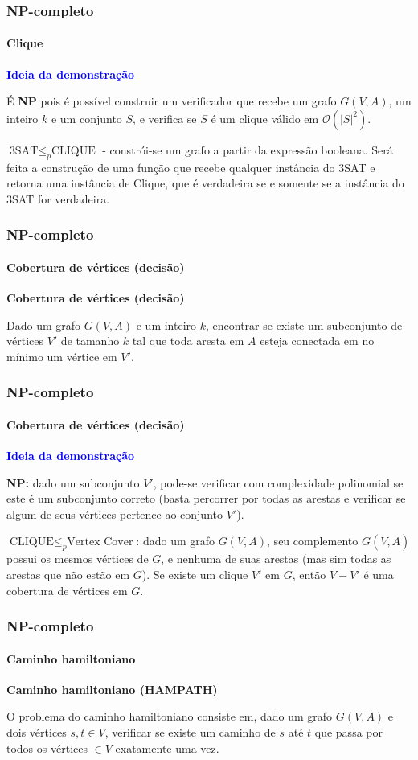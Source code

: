 \documentclass{beamer}
\begin{document}
\begin{frame}
\frametitle{NP-completo}
\framesubtitle{Clique}

\textcolor{blue}{\textbf{Ideia da demonstração}}

É \textbf{NP} pois é possível construir um verificador que recebe um grafo $G(V, A)$, um inteiro $k$ e um conjunto $S$, e verifica se $S$ é um clique válido em $\mathcal{O}(|S|^2)$.

\bigskip

$\text{3SAT} \leq_p \text{CLIQUE}$ - constrói-se um grafo a partir da expressão booleana. Será feita a construção de uma função que recebe qualquer instância do 3SAT e retorna uma instância de Clique, que é verdadeira se e somente se a instância do 3SAT for verdadeira.

\end{frame}


\begin{frame}
\frametitle{NP-completo}
\framesubtitle{Cobertura de vértices (decisão)}

\textcolor{blue(pigment)}{\textbf{Cobertura de vértices (decisão)}}

Dado um grafo $G(V, A)$ e um inteiro $k$, encontrar se existe um subconjunto de vértices $V'$ de tamanho $k$ tal que toda aresta em $A$ esteja conectada em no mínimo um vértice em $V'$.

\end{frame}

\begin{frame}
\frametitle{NP-completo}
\framesubtitle{Cobertura de vértices (decisão)}

\textcolor{blue}{\textbf{Ideia da demonstração}}

\textbf{NP: } dado um subconjunto $V'$, pode-se verificar com complexidade polinomial se este é um subconjunto correto (basta percorrer por todas as arestas e verificar se algum de seus vértices pertence ao conjunto $V'$).

\bigskip

$\text{CLIQUE} \leq_p \text{Vertex Cover}$: dado um grafo $G(V, A)$, seu complemento $\bar G(V, \bar A)$ possui os mesmos vértices de $G$, e nenhuma de suas arestas (mas sim todas as arestas que não estão em $G$). Se existe um clique $V'$ em $\bar G$, então $V - V'$ é uma cobertura de vértices em $G$.

\end{frame}

\begin{frame}
\frametitle{NP-completo}
\framesubtitle{Caminho hamiltoniano}

\textcolor{blue(pigment)}{\textbf{Caminho hamiltoniano (HAMPATH)}}

O problema do caminho hamiltoniano consiste em, dado um grafo $G(V, A)$ e dois vértices $s, t \in V$, verificar se existe um caminho de $s$ até $t$ que passa por todos os vértices $\in V$ exatamente uma vez.

\end{frame}
\end{document}
